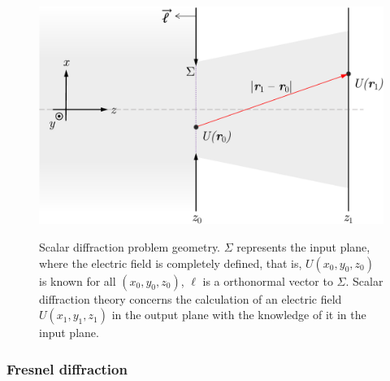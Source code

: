 \begin{refsection}
\begin{figure}[t]
    \centering
    {\includegraphics[width=.45\linewidth]{figures/ch02/diffraction_geometry.pdf}}
    \caption[Scalar diffraction problem geometry]{Scalar diffraction problem geometry. $\Sigma$ represents the input plane, where the electric field is completely defined, that is, $U(x_0, y_0, z_0)$ is known for all $(x_0, y_0, z_0)$, $\ell$ is a orthonormal vector to $\Sigma$. Scalar diffraction theory concerns the calculation of an electric field $U(x_1, y_1, z_1)$ in the output plane with the knowledge of it in the input plane.}
    \label{fig:diffraction}
\end{figure}

\subsubsection*{Fresnel diffraction}


\end{refsection}
